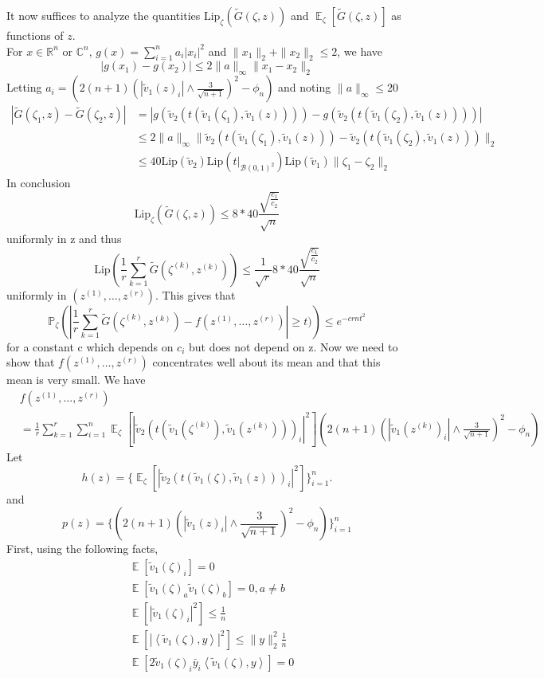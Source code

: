 \documentclass[11pt]{article}
\newcommand{\<}{\langle}
\renewcommand{\>}{\rangle}
\newcommand{\E}{\operatorname{\mathbb{E}}}
\numberwithin{equation}{section}
\newcommand{\lip}{\text{Lip}}
\newcommand{\Prob}{\mathbb{P}}
\begin{document}
It now suffices to analyze the quantities $\lip_{\zeta}(\tilde{G}(\zeta, z ))$ and $ \E_{\zeta}\left[\tilde{G}(\zeta, z )  \right]$ as functions of $z$.\\
 For $x \in \mathbb{R}^n$ or $\mathbb{C}^{n}$, $g(x) = \sum_{i=1}^{n}a_i |x_i|^2$ and $\|x_1\|_2 + \|x_2\|_2 \leq 2$, we have 
\[
|g(x_1)-g(x_2)| \leq 2\|a\|_{\infty}\|x_1-x_2\|_2
\]
Letting $a_i =  \left(2(n+1)(|\tilde{v}_1(z)_i|\wedge\frac{3}{\sqrt{n+1}} )^2-\phi_{n}\right)$ and noting $\|a\|_{\infty} \leq 20$
\begin{align*}
\left| \tilde{G}(\zeta_1, z ) - \tilde{G}(\zeta_2, z ) \right| &= \left| g(\tilde{v}_2(t(\tilde{v}_1(\zeta_1),\tilde{v}_1(z)))) - g(\tilde{v}_2(t(\tilde{v}_1(\zeta_2),\tilde{v}_1(z)))) \right|\\
&\leq 2 \|a\|_{\infty} \| \tilde{v}_2(t(\tilde{v}_1(\zeta_1),\tilde{v}_1(z))) -  \tilde{v}_2(t(\tilde{v}_1(\zeta_2),\tilde{v}_1(z))) \|_2\\
&\leq 40\lip(\tilde{v}_2)\lip(t|_{\mathcal{B}(0,1)^2})\lip(\tilde{v}_1)\|\zeta_1 - \zeta_2\|_2
\end{align*}
In conclusion
\[
\lip_{\zeta}(\tilde{G}(\zeta, z )) \leq 8*40\frac{\sqrt{\frac{c_1}{c_2}}}{\sqrt{n}}
\]
uniformly in z and thus
\[
\lip(\frac{1}{r}\sum_{k=1}^{r}\tilde{G}(\zeta^{(k)}, z^{(k)} )) \leq \frac{1}{\sqrt{r}}8*40\frac{\sqrt{\frac{c_1}{c_2}}}{\sqrt{n}}
\]
uniformly in $\left(z^{(1)},\ldots,z^{(r)}\right)$. This gives that
\[
\Prob_{\zeta} \left( \left| \frac{1}{r}\sum_{k=1}^r \tilde{G}(\zeta^{(k)}, z^{(k)} ) - f(z^{(1)},\ldots,z^{(r)}) \right| \geq t )  \right) \leq e^{-crnt^2}
\]
for a constant c which depends on $c_i$ but does not depend on z. Now we need to show that $f(z^{(1)},\ldots,z^{(r)})$ concentrates well about its mean and that this mean is very small. We have
\begin{align*}
&f(z^{(1)},\ldots,z^{(r)})\\
& = \frac{1}{r}\sum_{k=1}^{r}\sum_{i=1}^{n}\E_{\zeta} \left[|\tilde{v}_2(t(\tilde{v}_1(\zeta^{(k)}),\tilde{v}_1(z^{(k)})))_i|^2\right]\left(2(n+1)(|\tilde{v}_{1}(z^{(k)})_i |\wedge \frac{3}{\sqrt{n+1}})^2 - \phi_n \right)
\end{align*}
Let  
\[
h(z) = \{\E_{\zeta} \left[|\tilde{v}_2(t(\tilde{v}_1(\zeta),\tilde{v}_1(z)))_i|^2\right]\}_{i=1}^{n}.
\]
and
\[
p(z) = \{(2(n+1)(|\tilde{v}_{1}(z)_i |\wedge \frac{3}{\sqrt{n+1}})^2 - \phi_n )\}_{i=1}^{n}
\]
First, using the following facts,
\begin{align*}
&\E\left[ \tilde{v}_1(\zeta)_i \right] = 0\\
&\E\left[ \tilde{v}_1(\zeta)_a \tilde{v}_1(\zeta)_b \right] = 0, a \neq b\\
&\E\left[|\tilde{v}_1(\zeta)_i |^2\right] \leq \frac{1}{n}\\
&\E\left[ |\left< \tilde{v}_1( \zeta),y \right>|^2 \right] \leq \|y\|_2^2 \frac{1}{n}\\
& \E\left[ 2\tilde{v}_1(\zeta)_i \bar{y}_i \left<\tilde{v}_1(\zeta),y\right> \right] =0  
\end{align*}
\end{document}
